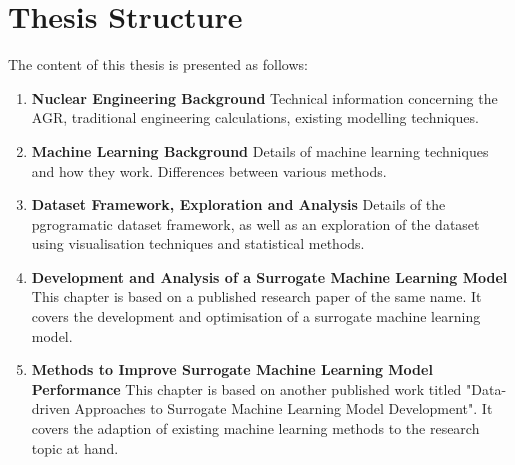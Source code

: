 \section{Thesis Structure}

The content of this thesis is presented as follows:

\begin{enumerate} 
	
	\item \textbf{Nuclear Engineering Background} Technical information concerning the AGR, traditional engineering calculations, existing modelling techniques. 
	
	\item \textbf{Machine Learning Background} Details of machine learning techniques and how they work. Differences between various methods.
	
	
	\item \textbf{Dataset Framework, Exploration and Analysis} Details of the pgrogramatic dataset framework, as well as an exploration of the dataset using visualisation techniques and statistical methods.
	
	\item \textbf{Development and Analysis of a Surrogate Machine Learning Model} This chapter is based on a published research paper of the same name. It covers the development and optimisation of a surrogate machine learning model. 
	
	\item \textbf{Methods to Improve Surrogate Machine Learning Model Performance} This chapter is based on another published work titled "Data-driven Approaches to Surrogate Machine Learning Model Development". It covers the adaption of existing machine learning methods to the research topic at hand.
		
\end{enumerate}
	
	


